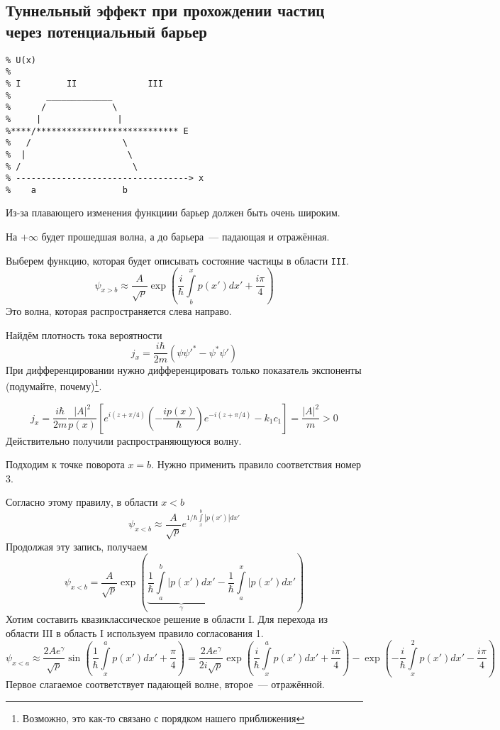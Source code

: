 \subsection{Туннельный эффект при прохождении частиц через потенциальный барьер}
\begin{verbatim}
% U(x)
%
% I         II              III
%       _____________
%      /             \
%     |               |
%****/**************************** E
%   /                  \
%  |                    \
% /                      \
% ----------------------------------> x
%    a                 b
\end{verbatim}
Из-за плавающего изменения функциии барьер должен быть очень широким.

На $+\infty$ будет прошедшая волна, а до барьера~--- падающая и отражённая.

Выберем функцию, которая будет описывать состояние частицы в области \texttt{III}.
$$
    \psi_{x > b} \approx \dfrac{A}{\sqrt p}  \exp \left(
        \dfrac{i}{\hbar} \int\limits_{b}^{x} p(x') dx' + \dfrac{i\pi}{4}
    \right)
$$
Это волна, которая распространяется слева направо.

Найдём плотность тока вероятности
$$
    j_x = \dfrac{i \hbar}{2 m} (\psi {\psi'}^\ast - \psi^\ast \psi')
$$
При дифференцировании нужно дифференцировать только показатель экспоненты (подумайте, почему)\footnote{Возможно, это как-то связано с порядком нашего приближения}.

$$
    j_x = \dfrac{i \hbar}{2 m} \dfrac{|A|^2}{p(x)} \left[ e^{i(z + \pi/4)} \left(
        -\dfrac{i p(x)}{\hbar}
    \right) e^{-i (z + \pi /4)} - k_1 c_1 \right] = \dfrac{|A|^2}{m} > 0
$$
Действительно получили распространяющуюся волну.

Подходим к точке поворота $x = b$. Нужно применить правило соответствия номер 3.

Согласно этому правилу, в области $x < b$
$$
    \psi_{x < b} \approx \dfrac{A}{\sqrt p} e^{1 / \hbar \int\limits_{x}^{b} |p(x')| dx'}
$$
Продолжая эту запись, получаем
$$
    \psi_{x < b} = \dfrac{A}{\sqrt p} \exp \left(
        \underbrace{\dfrac{1}{\hbar} \int\limits_{a}^{b} |p(x') dx'}_{\gamma} - \dfrac{1}{\hbar} \int\limits_{a}^{x} |p(x') dx'
    \right)
$$
Хотим составить квазиклассическое решение в области $\mathrm{I}$. Для перехода из области $\mathrm{III}$ в область $\mathrm{I}$ используем правило согласования 1.
$$
    \psi_{x < a} \approx \dfrac{2A e^{\gamma}}{\sqrt p} \sin \left(
        \dfrac{1}{\hbar} \int\limits_x^a p(x') dx' + \dfrac{\pi}{4}
    \right) = \dfrac{2 A e^{\gamma}}{2i \sqrt p}  \exp \left(
        \dfrac{i}{\hbar} \int\limits_x^a p(x') dx' + \dfrac{i \pi}{4}
    \right) - \exp \left(
        -\dfrac{i}{\hbar} \int\limits_x^2 p(x') dx' - \dfrac{i \pi}{4}
    \right)
$$ 
Первое слагаемое соответствует падающей волне, второе~--- отражённой.

